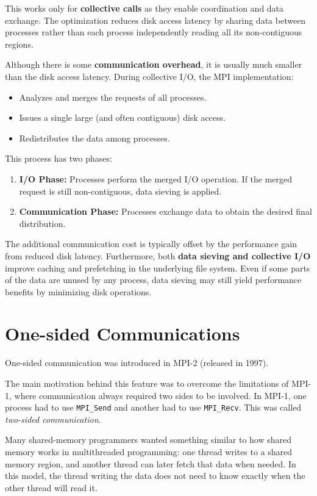 \documentclass[12pt]{book}
\begin{document}
This works only for \textbf{collective calls} as they enable coordination and data exchange. The optimization reduces disk access latency by sharing data between processes rather than each process independently reading all its non-contiguous regions.

Although there is some \textbf{communication overhead}, it is usually much smaller than the disk access latency. During collective I/O, the MPI implementation:
\begin{itemize}
    \item Analyzes and merges the requests of all processes.
    \item Issues a single large (and often contiguous) disk access.
    \item Redistributes the data among processes.
\end{itemize}

This process has two phases:
\begin{enumerate}
    \item \textbf{I/O Phase:} Processes perform the merged I/O operation. If the merged request is still non-contiguous, data sieving is applied.
    \item \textbf{Communication Phase:} Processes exchange data to obtain the desired final distribution.
\end{enumerate}

The additional communication cost is typically offset by the performance gain from reduced disk latency. Furthermore, both \textbf{data sieving and collective I/O} improve caching and prefetching in the underlying file system.  
Even if some parts of the data are unused by any process, data sieving may still yield performance benefits by minimizing disk operations.

\section{One-sided Communications}
One-sided communication was introduced in MPI-2 (released in 1997). 

The main motivation behind this feature was to overcome the limitations of MPI-1, where communication always required two sides to be involved. In MPI-1, one process had to use \texttt{MPI\_Send} and another had to use \texttt{MPI\_Recv}. This was called \emph{two-sided communication}. 

Many shared-memory programmers wanted something similar to how shared memory works in multithreaded programming: one thread writes to a shared memory region, and another thread can later fetch that data when needed. In this model, the thread writing the data does not need to know exactly when the other thread will read it.
\end{document}
